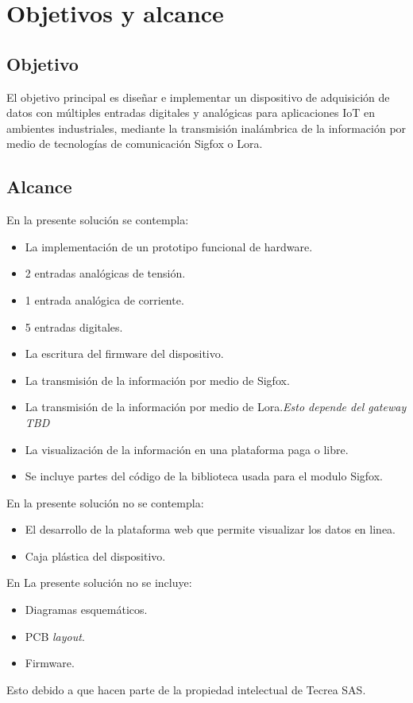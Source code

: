 \section{Objetivos y alcance}

\subsection{Objetivo}
El objetivo principal es diseñar e implementar un dispositivo de adquisición de datos con múltiples entradas digitales y analógicas para aplicaciones IoT en ambientes industriales, mediante la transmisión inalámbrica de la información por medio de tecnologías de comunicación Sigfox o Lora. 

\subsection{Alcance}

En la presente solución se contempla:


\begin{itemize}
	\item La implementación de un prototipo funcional de hardware.
	\item 2 entradas analógicas de tensión.
	\item 1 entrada analógica de corriente.
	\item 5 entradas digitales.
	\item La escritura del firmware del dispositivo.
	\item La transmisión de la información por medio de Sigfox.
	\item La transmisión de la información por medio de Lora.\emph{Esto depende del gateway TBD}
	\item La visualización de la información en una plataforma paga o libre.
	\item Se incluye partes del código de la biblioteca usada para el modulo Sigfox.
\end{itemize}
En la presente solución no se contempla:
\begin{itemize}
	\item El desarrollo de la plataforma web que permite visualizar los datos en linea.
	\item Caja plástica del dispositivo.
\end{itemize}
En La presente solución no se incluye:
\begin{itemize}
	\item Diagramas esquemáticos.
	\item PCB \textit{layout}.
	\item Firmware.
\end{itemize}

Esto debido a que hacen parte de la propiedad intelectual de Tecrea SAS.







